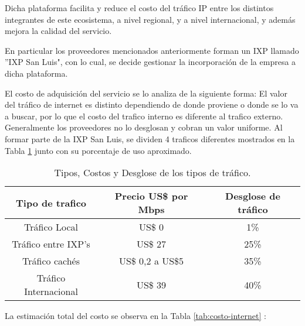 \begin{itemize}
Dicha plataforma facilita y reduce el costo del tráfico IP entre los distintos integrantes de este
ecosistema, a nivel regional, y a nivel internacional, y además mejora la calidad
del servicio.

En particular los proveedores mencionados anteriormente forman un IXP llamado 
''IXP San Luis", con lo cual, se decide gestionar la incorporación de la 
empresa a dicha plataforma.

El costo de adquisición del servicio se lo analiza de la siguiente forma:
El valor del tráfico de internet es distinto dependiendo de donde proviene o 
donde se lo va a buscar, por lo que el costo del trafico interno es diferente
al trafico externo.
Generalmente los proveedores no lo desglosan y cobran un valor uniforme.
Al formar parte de la IXP San Luis, se dividen 4 traficos diferentes mostrados
en la Tabla \ref{tab:trafico} junto con su porcentaje de uso aproximado.


\begin{table}[H]
  \centering
    \begin{tabular}{|c|c|c|}
    \hline
    \rowcolor[rgb]{ .773,  .851,  .945} \textbf{Tipo de trafico} & \textbf{Precio US\$ por Mbps} & \textbf{Desglose de tráfico} \bigstrut\\
    \hline
    Tráfico Local & US\$ 0 & 1\% \bigstrut\\
    \hline
    Tráfico entre IXP's & US\$ 27 & 25\% \bigstrut\\
    \hline
    Tráfico cachés & US\$ 0,2 a US\$5 & 35\% \bigstrut\\
    \hline
    Tráfico Internacional & US\$ 39 & 40\% \bigstrut\\
    \hline
    \end{tabular}%
	\caption{Tipos, Costos y Desglose de los tipos de tráfico.}
  \label{tab:trafico}%
\end{table}%

La estimación total del costo se observa en la Tabla \ref{tab:costo-internet} :





\end{itemize}
